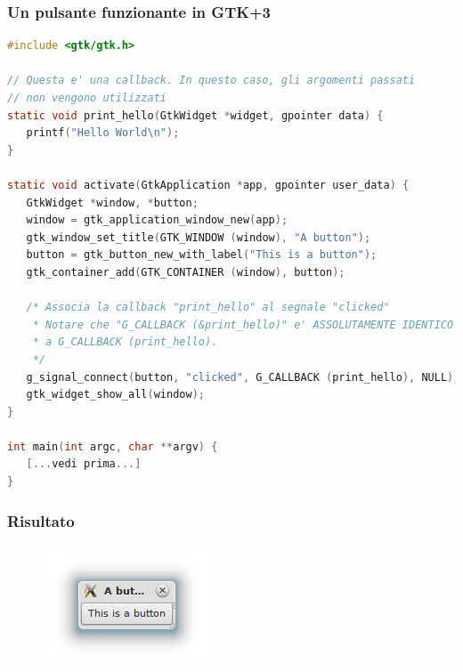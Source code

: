 \documentclass{beamer}
\begin{document}
\begin{frame}[fragile]
\frametitle{Un pulsante \textbf{funzionante} in GTK+3}
\begin{lstlisting}[language=C]
#include <gtk/gtk.h>

// Questa e' una callback. In questo caso, gli argomenti passati
// non vengono utilizzati
static void print_hello(GtkWidget *widget, gpointer data) {
   printf("Hello World\n");
}

static void activate(GtkApplication *app, gpointer user_data) {
   GtkWidget *window, *button;
   window = gtk_application_window_new(app);
   gtk_window_set_title(GTK_WINDOW (window), "A button");
   button = gtk_button_new_with_label("This is a button");
   gtk_container_add(GTK_CONTAINER (window), button);

   /* Associa la callback "print_hello" al segnale "clicked"
    * Notare che "G_CALLBACK (&print_hello)" e' ASSOLUTAMENTE IDENTICO
    * a G_CALLBACK (print_hello).
    */
   g_signal_connect(button, "clicked", G_CALLBACK (print_hello), NULL);
   gtk_widget_show_all(window);
}

int main(int argc, char **argv) {
   [...vedi prima...]
}
\end{lstlisting}
\end{frame}

\begin{frame}
\frametitle{Risultato}
\begin{figure}
 \includegraphics[width=0.6\columnwidth]{img/3}
\end{figure}
\end{frame}
\end{document}
